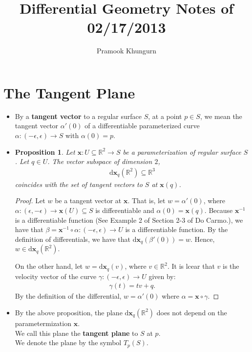 \documentclass[10pt]{article}
\title{Differential Geometry Notes of 02/17/2013}
\author{Pramook Khungurn}
\newtheorem{proposition}[lemma]{Proposition}
\newcommand{\dee}{\mathrm{d}}
\newcommand{\ve}[1]{\mathbf{#1}}
\newcommand{\ra}{\rightarrow}
\newcommand{\Real}{\mathbb{R}}
\newcommand{\sseq}{\subseteq}
\begin{document}
  \maketitle

  \section{The Tangent Plane}

  \begin{itemize}
    \item By a {\bf tangent vector} to a regular surface $S$, at a point $p \in S$, we mean the tangent vector $\alpha'(0)$ of a differentiable parameterized curve $\alpha: (-\epsilon, \epsilon) \ra S$ with $\alpha(0) = p$.

    \item \begin{proposition}
      Let $\ve{x}: U \sseq \Real^2 \ra S$ be a parameterization of regular surface $S$. Let $q \in U$. The vector subspace of dimension $2$, 
      \begin{align*}
        \dee \ve{x}_q(\Real^2) \sseq \Real^3
      \end{align*}
      coincides with the set of tangent vectors to $S$ at $\ve{x}(q)$.
    \end{proposition} 
    \begin{proof}
      Let $w$ be a tangent vector at $\ve{x}$. That is, let $w = \alpha'(0)$, where $\alpha:(\epsilon, -\epsilon) \ra \ve{x}(U) \sseq S$ is differentiable and $\alpha(0) = \ve{x}(q).$ Because $\ve{x}^{-1}$ is a differentiable function (See Example 2 of Section 2-3 of Do Carmo.), we have that $\beta = \ve{x}^{-1} \circ \alpha: (-\epsilon, \epsilon) \ra U$ is a differentiable function. By the definition of differentials, we have that $\dee \ve{x}_q(\beta'(0)) = w.$ Hence, $w \in \dee \ve{x}_q(\Real^2).$

      On the other hand, let $w = \dee \ve{x}_q(v)$, where $v \in \Real^2$. It is lcear that $v$ is the velocity vector of the curve $\gamma : (-\epsilon, \epsilon) \ra U$ given by:
      \begin{align*}
        \gamma(t) = tv + q.
      \end{align*}
      By the definition of the differential, $w = \alpha'(0)$ where $\alpha = \ve{x} \circ \gamma$.
    \end{proof}

    \item By the above proposition, the plane $\dee \ve{x}_q(\Real^2)$ does not depend on the parametermization $\ve{x}$.\\
    We call this plane the {\bf tangent plane} to $S$ at $p$.\\
    We denote the plane by the symbol $T_p(S)$.


\end{itemize}
\end{document}
